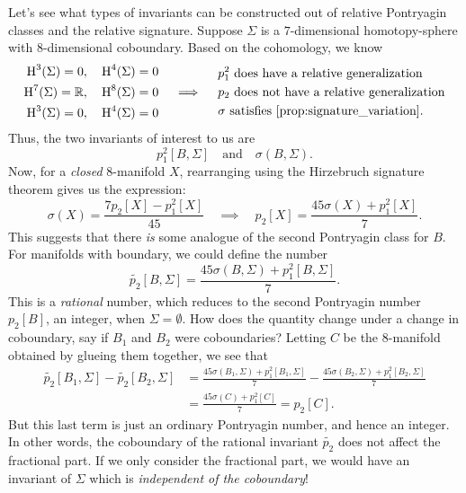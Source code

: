 Let's see what types of invariants can be constructed out of relative Pontryagin classes and the relative signature. Suppose $\Sigma$ is a $7$-dimensional homotopy-sphere with $8$-dimensional coboundary. Based on the cohomology, we know
\[
	\begin{aligned}
		\H^3(\Sigma)=0,  & \quad \H^4(\Sigma)=0 \\
		\H^7(\Sigma)=\R, & \quad \H^8(\Sigma)=0 \\
		\H^3(\Sigma)=0,  & \quad \H^4(\Sigma)=0
	\end{aligned}
	\quad\implies\quad
	\begin{aligned}
		 & p_1^2\textrm{ does have a relative generalization}         \\
		 & p_2\textrm{ does not have a relative generalization}       \\
		 & \sigma\textrm{ satisfies \cref{prop:signature_variation}.}
	\end{aligned}
\]
Thus, the two invariants of interest to us are
\[
	p_1^2[B,\Sigma]
	\quad\textrm{and}\quad
	\sigma(B, \Sigma).
\]
Now, for a \emph{closed} $8$-manifold $X$, rearranging using the Hirzebruch signature theorem gives us the expression:
\begin{equation}\label{eq:7-manifold_rearrangement}
	\sigma(X) = \frac{7p_2[X] - p_1^2[X]}{45}
	\quad\implies\quad
	p_2[X] = \frac{45\sigma(X) + p_1^2[X]}{7}.
\end{equation}
This suggests that there \emph{is} some analogue of the second Pontryagin class for $B$. For manifolds with boundary, we could define the number
\[
	\widetilde{p_2}[B, \Sigma] = \frac{45\sigma(B, \Sigma) + p_1^2[B, \Sigma]}{7}.
\]
This is a \emph{rational} number,
which reduces to the second Pontryagin number $p_2[B]$, an integer, when $\Sigma=\emptyset$. How does the quantity change under a change in coboundary, say if $B_1$ and $B_2$ were coboundaries? Letting $C$ be the $8$-manifold obtained by glueing them together, we see that
\[
	\begin{aligned}
		\widetilde{p_2}[B_1,\Sigma] - \widetilde{p_2}[B_2,\Sigma]
		 & = \frac{45\sigma(B_1,\Sigma) + p_1^2[B_1,\Sigma]}{7} - \frac{45\sigma(B_2, \Sigma) + p_1^2[B_2,\Sigma]}{7} \\
		 & =\frac{45\sigma(C) + p_1^2[C]}{7} = p_2[C].
	\end{aligned}
\]
But this last term is just an ordinary Pontryagin number, and hence an integer. In other words, the coboundary of the rational invariant $\widetilde{p_2}$ does not affect the fractional part. If we only consider the fractional part, we would have an invariant of $\Sigma$ which is \emph{independent of the coboundary}!
